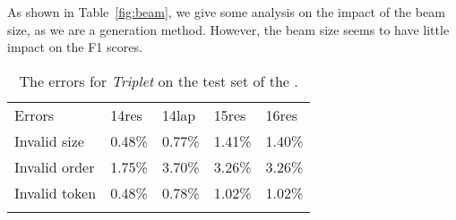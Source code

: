 \documentclass[11pt,a4paper]{article}
\begin{document}
As shown in Table~\ref{fig:beam}, we give some analysis on the impact of the beam size, as we are a generation method. However, the beam size seems to have little impact on the F1 scores. 




\begin{table}[h]
  \centering
  \setlength{\tabcolsep}{1pt} \renewcommand{\arraystretch}{1.3}
  \begin{tabular}{m{2.5cm}m{1.15cm}<{\centering}m{1.15cm}<{\centering}m{1.15cm}<{\centering}m{1.15cm}<{\centering}}
    \Xhline{0.08em}
  Errors               & 14res  & 14lap  & 15res  & 16res  \\
  \cline{1-5}
  Invalid size         & 0.48\% & 0.77\% & 1.41\% & 1.40\% \\
  Invalid order        & 1.75\% & 3.70\% & 3.26\% & 3.26\% \\
  Invalid token      & 0.48\% & 0.78\% & 1.02\% & 1.02\% \\
  \Xhline{0.08em}
  \end{tabular}
  \caption{The errors  for \emph{Triplet} on the test set of the \emph{}.  }
  \label{tb:error}
  \end{table}
\end{document}
